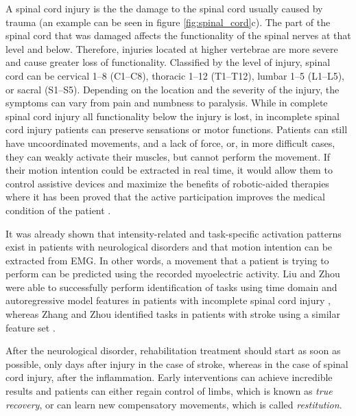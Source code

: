 A spinal cord injury is the the damage to the spinal cord usually caused by trauma (an example can be seen in figure \ref{fig:spinal_cord}c). The part of the spinal cord that was damaged affects the functionality of the spinal nerves at that level and below. Therefore, injuries located at higher vertebrae are more severe and cause greater loss of functionality. Classified by the level of injury, spinal cord can be cervical 1–8 (C1–C8), thoracic 1–12 (T1–T12), lumbar 1–5 (L1–L5), or sacral (S1–S5). Depending on the location and the severity of the injury, the symptoms can vary from pain and numbness to paralysis. While in complete spinal cord injury all functionality below the injury is lost, in incomplete spinal cord injury patients can preserve sensations or motor functions. Patients can still have uncoordinated movements, and a lack of force, or, in more difficult cases, they can weakly activate their muscles, but cannot perform the movement. If their motion intention could be extracted in real time, it would allow them to control assistive devices and maximize the benefits of robotic-aided therapies where it has been proved that the active participation improves the medical condition of the patient \citep{Hogan2006}.

It was already shown that intensity-related and task-specific activation patterns exist in patients with neurological disorders and that motion intention can be extracted from EMG. In other words, a movement that a patient is trying to perform can be predicted using the recorded myoelectric activity. Liu and Zhou were able to successfully perform identification of tasks using time domain and autoregressive model features in patients with incomplete spinal cord injury \citep{Liu2013}, whereas Zhang and Zhou identified tasks in patients with stroke using a similar feature set \citep{Zhang2012}.

After the neurological disorder, rehabilitation treatment should start as soon as possible, only days after injury in the case of stroke, whereas in the case of spinal cord injury, after the inflammation. Early interventions can achieve incredible results and patients can either regain control of limbs, which is known as \emph{true recovery}, or can learn new compensatory movements, which is called \emph{restitution}. 

